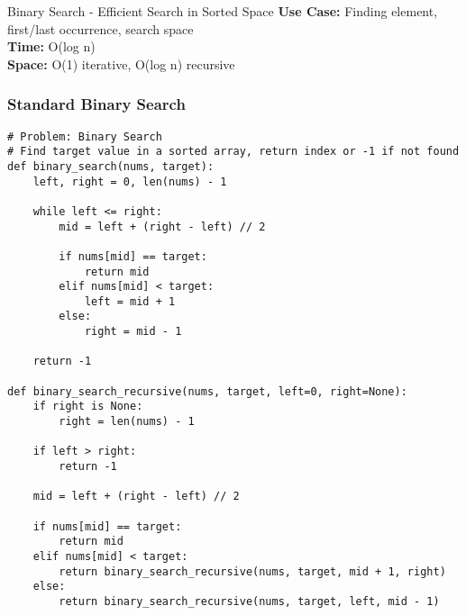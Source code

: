 \documentclass[10pt,a4paper]{article}
\begin{document}
\begin{patternbox}{Binary Search - Efficient Search in Sorted Space}
\textbf{Use Case:} Finding element, first/last occurrence, search space\\
\textbf{Time:} O(log n)\\
\textbf{Space:} O(1) iterative, O(log n) recursive
\end{patternbox}

\subsubsection{Standard Binary Search}
\begin{lstlisting}
# Problem: Binary Search
# Find target value in a sorted array, return index or -1 if not found
def binary_search(nums, target):
    left, right = 0, len(nums) - 1

    while left <= right:
        mid = left + (right - left) // 2

        if nums[mid] == target:
            return mid
        elif nums[mid] < target:
            left = mid + 1
        else:
            right = mid - 1

    return -1

def binary_search_recursive(nums, target, left=0, right=None):
    if right is None:
        right = len(nums) - 1

    if left > right:
        return -1

    mid = left + (right - left) // 2

    if nums[mid] == target:
        return mid
    elif nums[mid] < target:
        return binary_search_recursive(nums, target, mid + 1, right)
    else:
        return binary_search_recursive(nums, target, left, mid - 1)
\end{lstlisting}
\end{document}

